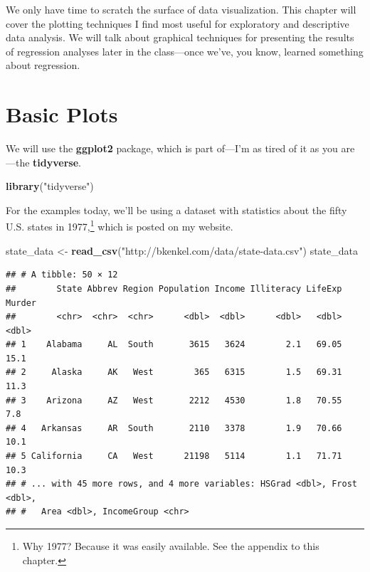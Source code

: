\documentclass[12pt,oneside,openany]{book}
\newenvironment{Shaded}{\begin{snugshade}}{\end{snugshade}}
\newcommand{\KeywordTok}[1]{\textcolor[rgb]{0.13,0.29,0.53}{\textbf{#1}}}
\newcommand{\StringTok}[1]{\textcolor[rgb]{0.31,0.60,0.02}{#1}}
\newcommand{\NormalTok}[1]{#1}
\let\rmarkdownfootnote\footnote%
\def\footnote{\protect\rmarkdownfootnote}
\begin{document}
We only have time to scratch the surface of data visualization. This
chapter will cover the plotting techniques I find most useful for
exploratory and descriptive data analysis. We will talk about graphical
techniques for presenting the results of regression analyses later in
the class---once we've, you know, learned something about regression.

\section{Basic Plots}\label{basic-plots}

We will use the \textbf{ggplot2} package, which is part of---I'm as
tired of it as you are---the \textbf{tidyverse}.

\begin{Shaded}
\begin{Highlighting}[]
\KeywordTok{library}\NormalTok{(}\StringTok{"tidyverse"}\NormalTok{)}
\end{Highlighting}
\end{Shaded}

For the examples today, we'll be using a dataset with statistics about
the fifty U.S. states in 1977,\footnote{Why 1977? Because it was easily
  available. See the appendix to this chapter.} which is posted on my
website.

\begin{Shaded}
\begin{Highlighting}[]
\NormalTok{state_data <-}\StringTok{ }\KeywordTok{read_csv}\NormalTok{(}\StringTok{"http://bkenkel.com/data/state-data.csv"}\NormalTok{)}
\NormalTok{state_data}
\end{Highlighting}
\end{Shaded}

\begin{verbatim}
## # A tibble: 50 × 12
##        State Abbrev Region Population Income Illiteracy LifeExp Murder
##        <chr>  <chr>  <chr>      <dbl>  <dbl>      <dbl>   <dbl>  <dbl>
## 1    Alabama     AL  South       3615   3624        2.1   69.05   15.1
## 2     Alaska     AK   West        365   6315        1.5   69.31   11.3
## 3    Arizona     AZ   West       2212   4530        1.8   70.55    7.8
## 4   Arkansas     AR  South       2110   3378        1.9   70.66   10.1
## 5 California     CA   West      21198   5114        1.1   71.71   10.3
## # ... with 45 more rows, and 4 more variables: HSGrad <dbl>, Frost <dbl>,
## #   Area <dbl>, IncomeGroup <chr>
\end{verbatim}
\end{document}
